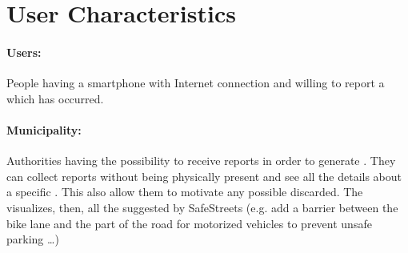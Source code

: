 \documentclass[../../rasd.tex]{subfiles}
\begin{document}
	
	\section{User Characteristics}

		\paragraph{Users:}
		People having a smartphone with Internet connection and willing to report a  which has occurred. 
		\paragraph{Municipality:}
		Authorities having the possibility to receive  reports in order to generate . They can collect reports without being physically present and see all the details about a specific . This also allow them to motivate any possible  discarded. The  visualizes, then, all the  suggested by SafeStreets (e.g. add a barrier between the bike lane and the part of the road for motorized vehicles to prevent unsafe parking …) 
		
		
\end{document}
